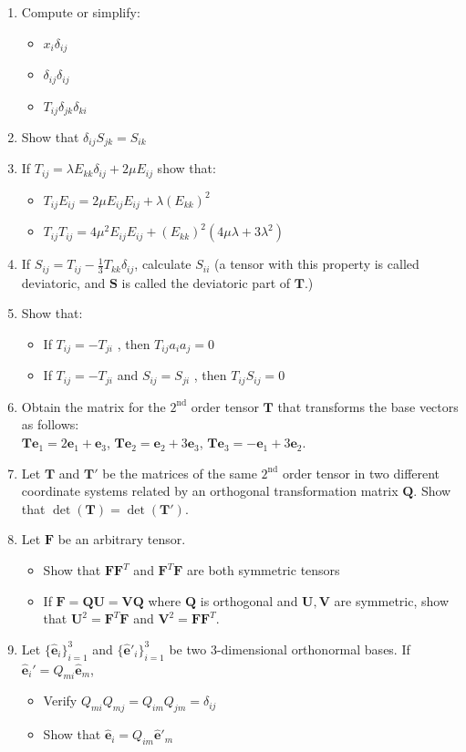 \documentclass{article}
\newcommand{\bi}{\begin{itemize}}
\newcommand{\ei}{\end{itemize}}
\newcommand{\bs}{\boldsymbol}
\begin{document}
\begin{enumerate}
\newpage
\item Compute or simplify:
\bi
\item $x_i \delta_{ij}$
\item $\delta_{ij}\delta_{ij}$
\item $T_{ij}\delta_{jk}\delta_{ki}$
\ei

\item Show that $\delta_{ij} S_{jk} = S_{ik}$

\item If $ T_{ij} =\lambda E_{kk}\delta_{ij}+2\mu E_{ij}$ show that:
\bi
\item $T_{ij} E_{ij}=2\mu E_{ij}E_{ij}+\lambda (E_{kk})^2$
\item $T_{ij} T_{ij}= 4\mu ^2 E_{ij} E_{ij}+ (E_{kk})^2 (4\mu \lambda+3\lambda^2)$ 
\ei


\item If $S_{ij}=T_{ij} - \frac{1}{3}T_{kk} \delta_{ij}$, calculate $S_{ii}$ (a tensor with this property is called
deviatoric, and $\bs S$ is called the deviatoric part of $\bs T$.)


\item  Show that:
\bi
\item  If $T_{ij}=-T_{ji}$ , then $T_{ij} a_i a_j=0$
\item If $T_{ij}=-T_{ji}$  and $S_{ij} =S_{ji}$ , then $T_{ij} S_{ij}=0$
\ei

\item Obtain the matrix for the $2^{\textrm{nd}}$ order tensor $\bs{T}$ that transforms the base vectors as follows: \\
$\bs{T}\bs{e}_1=2\bs{e}_1+\bs{e}_3$, $\bs{T}\bs{e}_2=\bs{e}_2+3\bs{e}_3$, $\bs{T}\bs{e}_3=-\bs{e}_1+3\bs{e}_2$.

\item  Let $\bs{T}$ and $\bs{T}'$ be the matrices of the same $2^{\textrm{nd}}$ order tensor in two different coordinate
systems related by an orthogonal transformation matrix $\bs Q$. Show that $\det(\bs{T}) = \det(\bs{T}')$.


\item  Let $\bs{F}$ be an arbitrary tensor.
\bi
\item Show that $\bs{F}\bs{F}^T$ and $\bs{F}^T\bs{F}$ are both symmetric tensors
\item  If $\bs{F}=\bs{QU}=\bs{VQ}$ where $\bs{Q}$ is orthogonal and $\bs{U,V}$ are symmetric, show that
$\bs{U}^2=\bs{F}^T\bs{F}$ and $\bs{V}^2=\bs{F}\bs{F}^T$.
\ei

\item  Let $\{\bs{\hat{e}}_i\}_{i = 1}^3$  and $\{\bs{\hat{e}}'_i\}_{i = 1}^3$ be two 3-dimensional orthonormal
bases. If $\bs{\hat{e}}_i' = Q_{mi}\bs{\hat{e}}_m$,
\bi
\item  Verify $Q_{mi}Q_{mj}=Q_{im}Q_{jm}=\delta_{ij}$
\item  Show that $\bs{\hat{e}}_i=Q_{im}\bs{\hat{e}}'_m$
\ei

\end{enumerate}
\end{document}
